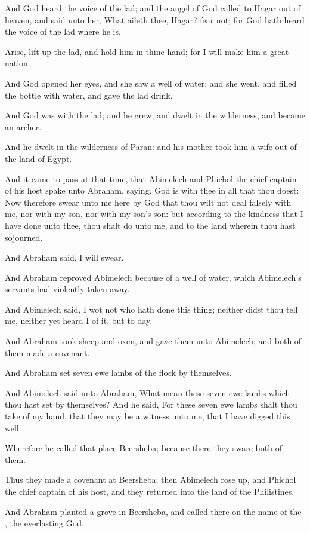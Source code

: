 \verse And God heard the voice of the lad; and the angel of God called to Hagar out of heaven, and said unto her, What aileth thee, Hagar?  fear not; for God hath heard the voice of the lad where he is.

\verse Arise, lift up the lad, and hold him in thine hand; for I will make him a great nation.

\verse And God opened her eyes, and she saw a well of water; and she went, and filled the bottle with water, and gave the lad drink.

\verse And God was with the lad; and he grew, and dwelt in the wilderness, and became an archer.

\verse And he dwelt in the wilderness of Paran: and his mother took him a wife out of the land of Egypt.

\verse And it came to pass at that time, that Abimelech and Phichol the chief captain of his host spake unto Abraham, saying, God is with thee in all that thou doest: \verse Now therefore swear unto me here by God that thou wilt not deal falsely with me, nor with my son, nor with my son's son: but according to the kindness that I have done unto thee, thou shalt do unto me, and to the land wherein thou hast sojourned.

\verse And Abraham said, I will swear.

\verse And Abraham reproved Abimelech because of a well of water, which Abimelech's servants had violently taken away.

\verse And Abimelech said, I wot not who hath done this thing; neither didst thou tell me, neither yet heard I of it, but to day.

\verse And Abraham took sheep and oxen, and gave them unto Abimelech; and both of them made a covenant.

\verse And Abraham set seven ewe lambs of the flock by themselves.

\verse And Abimelech said unto Abraham, What mean these seven ewe lambs which thou hast set by themselves?  \verse And he said, For these seven ewe lambs shalt thou take of my hand, that they may be a witness unto me, that I have digged this well.

\verse Wherefore he called that place Beersheba; because there they sware both of them.

\verse Thus they made a covenant at Beersheba: then Abimelech rose up, and Phichol the chief captain of his host, and they returned into the land of the Philistines.

\verse And Abraham planted a grove in Beersheba, and called there on the name of the \LORD, the everlasting God.

